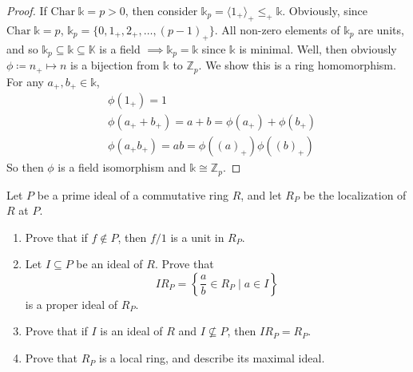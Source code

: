 \documentclass[addpoints,10pt]{exam}
\theoremstyle{plain}
\theoremstyle{definition}
\newtheorem{prob}[thm]{Problem}
\theoremstyle{plain}
\theoremstyle{plain}
\theoremstyle{definition}
\let\oldprob\prob
\let\endoldprob\endprob
\renewenvironment{prob}
  {\begin{singlespace}\oldprob}
  {\endoldprob\end{singlespace}}
\newcommand{\KK}{\ensuremath{\mathbb{K}}}
\newcommand{\ZZ}{\ensuremath{\mathbb{Z}}}
\newcommand{\kk}{\ensuremath{\mathds{k}}}
\newcommand{\Char}[1]{\mathrm{Char}\; #1}
\begin{document}
\begin{proof}
    If $\Char{\kk}=p>0$, then consider $\kk_{p}=\langle 1_{+}\rangle_{+}\leq_{+} \kk$. Obviously, since $\Char{\kk}=p$, $\kk_{p}=\{0,1_{+},2_{+},\hdots, (p-1)_{+}\}$. All non-zero elements of $\kk_{p}$ are units, and so $\kk_{p}\subseteq \kk\subseteq \KK$ is a field $\implies \kk_{p}=\kk$ since $\kk$ is minimal. Well, then obviously $\phi\coloneq n_{+}\mapsto n$ is a bijection from $\kk$ to  $\ZZ_{p}$. We show this is a ring homomorphism. For any $a_{+},b_{+}\in \kk$,
    \begin{align*}
        &\phi(1_{+})=1\\
        &\phi(a_{+}+b_{+})=a+b=\phi(a_{+})+\phi(b_{+})\\
        &\phi(a_{+}b_{+})=ab=\phi((a)_{+})\phi((b)_{+})
    \end{align*}
    So then $\phi$ is a field isomorphism and $\kk\cong \ZZ_{p}.$

\end{proof}
\newpage
\begin{prob}
Let $P$ be a prime ideal of a commutative ring $R$, and let $R_P$ be the localization of $R$ at $P$.
\begin{enumerate}[label=(\alph*)]
\item Prove that if $f \notin P$, then $f/1$ is a unit in $R_P$.
\item Let $I \subseteq P$ be an ideal of $R$. Prove that
\[
IR_P = \left\{\frac{a}{b} \in R_P \mid a \in I\right\}
\]
is a proper ideal of $R_P$.
\item Prove that if $I$ is an ideal of $R$ and $I \not\subseteq P$, then $IR_P = R_P$.
\item Prove that $R_P$ is a local ring, and describe its maximal ideal.
\end{enumerate}
\end{prob}
\end{document}
